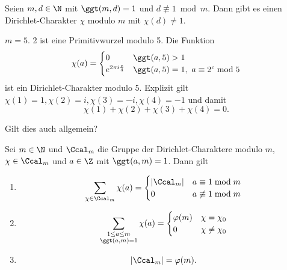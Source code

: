 \begin{lem}\autolabel
	Seien $m,d \in \N$ mit $\ggt(m,d)=1$ und $d \not\equiv1 \bmod m$. Dann gibt es einen Dirichlet-Charakter $\chi$ modulo $m$ mit $\chi(d) \neq 1$.
\end{lem}

\begin{exmp*}
	$m = 5$. 2 ist eine Primitivwurzel modulo 5. Die Funktion
	\[ \chi(a) = \begin{cases}
		0 &\ggt(a,5)>1\\
		e^{2\pi i \frac{c}{4}} &\ggt(a,5)=1,\ a \equiv 2^c \bmod 5
	\end{cases} \]
	ist ein Dirichlet-Charakter modulo 5. Explizit gilt $\chi(1)=1, \chi(2)=i,\chi(3)=-i,\chi(4)=-1$ und damit
	\[ \chi(1)+\chi(2)+\chi(3)+\chi(4)=0. \]
\end{exmp*}

\begin{frage*}
	Gilt dies auch allgemein?
\end{frage*}

\begin{thm}\autolabel
	Sei $m \in \N$ und $\Ccal_m$ die Gruppe der Dirichlet-Charaktere modulo $m$, $\chi \in \Ccal_m$ und $a \in \Z$ mit $\ggt(a,m)=1$. Dann gilt
	\begin{enumerate}[label={\roman*})]
		\item \[ \sum_{\chi \in \Ccal_m} \chi(a) = \begin{cases}
				|\Ccal_m| &a \equiv 1 \bmod m\\
				0 &a \not\equiv 1 \bmod m
			\end{cases} \]
		\item \[ \sum_{\substack{1 \leq a \leq m\\\ggt(a,m)=1}} \chi(a) = \begin{cases}
				\varphi(m) &\chi = \chi_0\\
				0 &\chi \neq \chi_0
			\end{cases} \]
		\item \[ |\Ccal_m| = \varphi(m). \]
	\end{enumerate}
\end{thm}